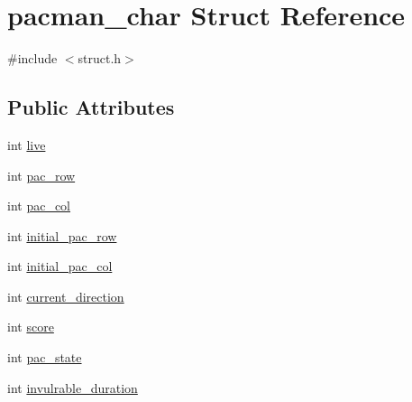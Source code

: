 \hypertarget{structpacman__char}{\section{pacman\-\_\-char Struct Reference}
\label{structpacman__char}
}


{\ttfamily \#include $<$struct.\-h$>$}

\subsection*{Public Attributes}
\begin{DoxyCompactItemize}
\item 
int \hyperlink{structpacman__char_a37a3feb51101b9a6c0bae26c2e80c9eb}{live}
\item 
int \hyperlink{structpacman__char_a749edbe7d8d02c6bbce5d1a7ac6f9d0f}{pac\-\_\-row}
\item 
int \hyperlink{structpacman__char_aed55e8b8b665a7b0fa8b04b8c0555fbe}{pac\-\_\-col}
\item 
int \hyperlink{structpacman__char_abdcc93fc6294b2457dbb819031cef5da}{initial\-\_\-pac\-\_\-row}
\item 
int \hyperlink{structpacman__char_aa72fcc7405da058c6ddf4e0a8f270596}{initial\-\_\-pac\-\_\-col}
\item 
int \hyperlink{structpacman__char_aa6c383fdddd953db38dd6a03cd6db278}{current\-\_\-direction}
\item 
int \hyperlink{structpacman__char_ad5ec0d2c3024dcf105575a378bf701cb}{score}
\item 
int \hyperlink{structpacman__char_a70880600ba726af6be3bfa3173db3e63}{pac\-\_\-state}
\item 
int \hyperlink{structpacman__char_a227e1e792e0cd8e2bff26aeb3894a687}{invulrable\-\_\-duration}
\end{DoxyCompactItemize}


